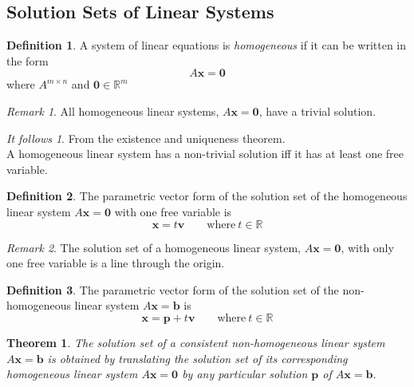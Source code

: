 \documentclass{article}
\renewcommand{\vec}[1]{\textbf{#1}}
\newtheorem{theorem}{Theorem}[section]
\theoremstyle{definition}
\newtheorem{definition}{Definition}[section]
\theoremstyle{remark}
\newtheorem*{remark}{Remark}
\theoremstyle{remark}
\theoremstyle{remark}
\newtheorem*{it follows}{It follows}
\begin{document}
\subsection{Solution Sets of Linear Systems}

\begin{definition}
  A system of linear equations is \textit{homogeneous} if it can be written in the form
  $$A \vec{x} = \vec{0}$$
  where $A^{m \times n}$ and $\vec{0} \in \mathbb{R}^m$
\end{definition}

\begin{remark}
  All homogeneous linear systems, $A\vec{x} = \vec{0}$, have a trivial solution.
\end{remark}

\begin{it follows}
  From the existence and uniqueness theorem. \\
  A homogeneous linear system has a non-trivial solution iff it has at least one free variable.
\end{it follows}

\begin{definition}
  The parametric vector form of the solution set of the homogeneous linear system $A\vec{x} = \vec{0}$ with one free variable is
  $$ \vec{x} = t\vec{v} \qquad \text{where}\ t \in \mathbb{R}$$
\end{definition}

\begin{remark}
  The solution set of a homogeneous linear system, $A\vec{x} = \vec{0}$, with only one free variable is a line through the origin.
\end{remark}

\begin{definition}
  The parametric vector form of the solution set of the non-homogeneous linear system $A\vec{x} = \vec{b}$ is
  $$ \vec{x} = \vec{p} + t\vec{v} \qquad \text{where}\ t \in \mathbb{R}$$
\end{definition}

\begin{theorem}
  The solution set of a consistent non-homogeneous linear system $A\vec{x} = \vec{b}$ is obtained by translating the solution set of its corresponding homogeneous linear system $A\vec{x} = \vec{0}$ by any particular solution $\vec{p}$ of $A\vec{x} = \vec{b}$. 
\end{theorem}
\end{document}
